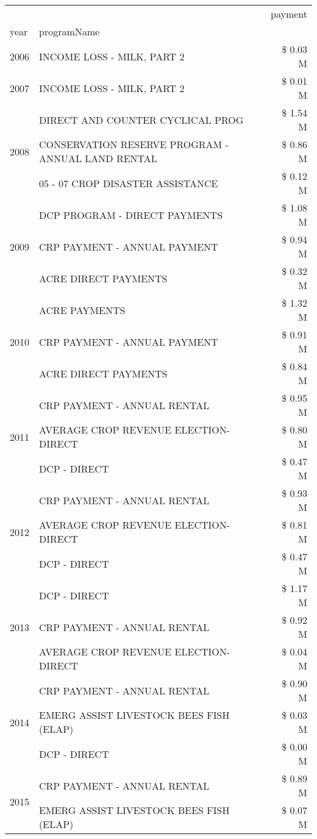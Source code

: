 \begin{tabular}{llr}
\toprule
 &  & payment \\
year & programName &  \\
\midrule
2006 & INCOME LOSS - MILK, PART 2 & \$ 0.03 M \\
\cline{1-3}
2007 & INCOME LOSS - MILK, PART 2 & \$ 0.01 M \\
\cline{1-3}
\multirow[t]{3}{*}{2008} & DIRECT AND COUNTER CYCLICAL PROG & \$ 1.54 M \\
 & CONSERVATION RESERVE PROGRAM - ANNUAL LAND RENTAL & \$ 0.86 M \\
 & 05 - 07 CROP DISASTER ASSISTANCE & \$ 0.12 M \\
\cline{1-3}
\multirow[t]{3}{*}{2009} & DCP PROGRAM - DIRECT PAYMENTS & \$ 1.08 M \\
 & CRP PAYMENT - ANNUAL PAYMENT & \$ 0.94 M \\
 & ACRE DIRECT PAYMENTS & \$ 0.32 M \\
\cline{1-3}
\multirow[t]{3}{*}{2010} & ACRE PAYMENTS & \$ 1.32 M \\
 & CRP PAYMENT - ANNUAL PAYMENT & \$ 0.91 M \\
 & ACRE DIRECT PAYMENTS & \$ 0.84 M \\
\cline{1-3}
\multirow[t]{3}{*}{2011} & CRP PAYMENT - ANNUAL RENTAL & \$ 0.95 M \\
 & AVERAGE CROP REVENUE ELECTION-DIRECT & \$ 0.80 M \\
 & DCP - DIRECT & \$ 0.47 M \\
\cline{1-3}
\multirow[t]{3}{*}{2012} & CRP PAYMENT - ANNUAL RENTAL & \$ 0.93 M \\
 & AVERAGE CROP REVENUE ELECTION-DIRECT & \$ 0.81 M \\
 & DCP - DIRECT & \$ 0.47 M \\
\cline{1-3}
\multirow[t]{3}{*}{2013} & DCP - DIRECT & \$ 1.17 M \\
 & CRP PAYMENT - ANNUAL RENTAL & \$ 0.92 M \\
 & AVERAGE CROP REVENUE ELECTION-DIRECT & \$ 0.04 M \\
\cline{1-3}
\multirow[t]{3}{*}{2014} & CRP PAYMENT - ANNUAL RENTAL & \$ 0.90 M \\
 & EMERG ASSIST LIVESTOCK BEES FISH (ELAP) & \$ 0.03 M \\
 & DCP - DIRECT & \$ 0.00 M \\
\cline{1-3}
\multirow[t]{3}{*}{2015} & CRP PAYMENT - ANNUAL RENTAL & \$ 0.89 M \\
 & EMERG ASSIST LIVESTOCK BEES FISH (ELAP) & \$ 0.07 M \\

\end{tabular}
